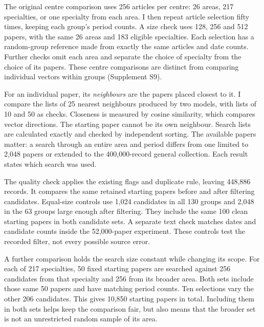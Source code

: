 \documentclass[12pt]{article}
\begin{document}
The original centre comparison uses 256 articles per centre: 26 areas, 217 specialties, or one specialty from each area. I then repeat article selection fifty times, keeping each group's period counts. A size check uses 128, 256 and 512 papers, with the same 26 areas and 183 eligible specialties. Each selection has a random-group reference made from exactly the same articles and date counts. Further checks omit each area and separate the choice of specialty from the choice of its papers. These centre comparisons are distinct from comparing individual vectors within groups (Supplement S9).

For an individual paper, its \emph{neighbours} are the papers placed closest to it. I compare the lists of 25 nearest neighbours produced by two models, with lists of 10 and 50 as checks. Closeness is measured by cosine similarity, which compares vector directions. The starting paper cannot be its own neighbour. Search lists are calculated exactly and checked by independent sorting. The available papers matter: a search through an entire area and period differs from one limited to 2,048 papers or extended to the 400,000-record general collection. Each result states which search was used.

The quality check applies the existing flags and duplicate rule, leaving 448,886 records. It compares the same retained starting papers before and after filtering candidates. Equal-size controls use 1,024 candidates in all 130 groups and 2,048 in the 63 groups large enough after filtering. They include the same 100 clean starting papers in both candidate sets. A separate text check matches dates and candidate counts inside the 52,000-paper experiment. These controls test the recorded filter, not every possible source error.

A further comparison holds the search size constant while changing its scope. For each of 217 specialties, 50 fixed starting papers are searched against 256 candidates from that specialty and 256 from its broader area. Both sets include those same 50 papers and have matching period counts. Ten selections vary the other 206 candidates. This gives 10,850 starting papers in total. Including them in both sets helps keep the comparison fair, but also means that the broader set is not an unrestricted random sample of its area.
\end{document}
